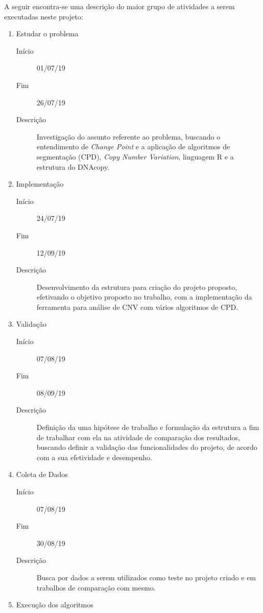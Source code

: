 A seguir encontra-se uma descrição do maior grupo de atividades a serem executadas neste projeto:

\begin{enumerate}
   \item Estudar o problema
   \begin{description}
        \item[Início] 01/07/19
        \item[Fim] 26/07/19
        \item[Descrição] Investigação do assunto referente ao problema, buscando o entendimento de \textit{Change Point} e a aplicação de algoritmos de segmentação (CPD), \textit{Copy Number Variation}, linguagem R e a estrutura do DNAcopy.
    \end{description}
   \item Implementação
   \begin{description}
        \item[Início] 24/07/19
        \item[Fim] 12/09/19
        \item[Descrição] Desenvolvimento da estrutura para criação do projeto proposto, efetivando o objetivo proposto no trabalho, com a implementação da ferramenta para análise de CNV com vários algoritmos de CPD.
    \end{description}
   \item Validação
   \begin{description}
        \item[Início] 07/08/19
        \item[Fim] 08/09/19
        \item[Descrição] Definição da uma hipótese de trabalho e formulação da estrutura a fim de trabalhar com ela na atividade de comparação dos resultados, buscando definir a validação das funcionalidades do projeto, de acordo com a sua efetividade e desempenho.
    \end{description}
   \item Coleta de Dados
   \begin{description}
        \item[Início] 07/08/19
        \item[Fim] 30/08/19
        \item[Descrição] Busca por dados a serem utilizados como teste no projeto criado e em trabalhos de comparação com mesmo.
    \end{description}
   \item Execução dos algoritmos
   \begin{description}

\end{description}
\end{enumerate}

